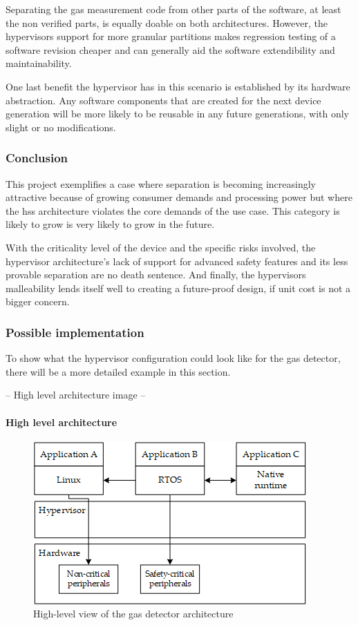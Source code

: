 Separating the gas measurement code from other parts of the software, at least the non verified parts, is equally doable on both architectures. However, the hypervisors support for more granular partitions makes regression testing of a software revision cheaper and can generally aid the software extendibility and maintainability.

One last benefit the hypervisor has in this scenario is established by its hardware abstraction. Any software components that are created for the next device generation will be more likely to be reusable in any future generations, with only slight or no modifications.
\subsubsection{Conclusion}
This project exemplifies a case where separation is becoming increasingly attractive because of growing consumer demands and processing power but where the \acrshort{hss} architecture violates the core demands of the use case. This category is likely to grow is very likely to grow in the future\cite{ITA.May2016}.

With the criticality level of the device and the specific risks involved, the hypervisor architecture's lack of support for advanced safety features and its less provable separation are no death sentence. And finally, the hypervisors malleability lends itself well to creating a future-proof design, if unit cost is not a bigger concern. 
\subsubsection{Possible implementation}
To show what the hypervisor configuration could look like for the gas detector, there will be a more detailed example in this section.



-- High level architecture image --
\paragraph{High level architecture}

\begin{figure}[ht!]
\centering
\includegraphics[scale=0.50]{Figures/gas_detect_high_level.png}
\decoRule
\caption{High-level view of the gas detector architecture}
\label{fig:gas_detect_high_level}
\end{figure}

